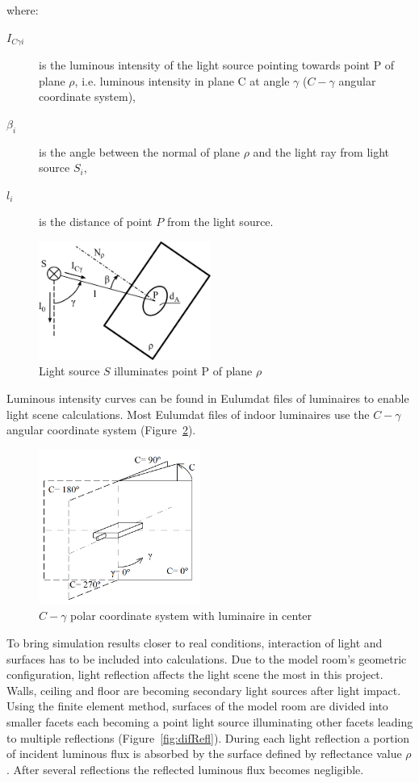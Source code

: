 \noindent where:
\begin{description}
	\item[$I_{C \gamma i}$] is the luminous intensity of the light source pointing towards point P of plane $\rho$, i.e. luminous intensity in plane C at angle $\gamma$ ($C-\gamma$ angular coordinate system),
	\item[$\beta_{i}$] is the angle between the normal of plane $\rho$ and the light ray from light source $S_{i}$,
	\item[$l_{i}$] is the distance of point $P$ from the light source.
\end{description}

\begin{figure}[htb]
  \centering
  \includegraphics[width=160pt]{315_osvetlenost_bodovym_zdrojem_2}
  \caption{Light source $S$ illuminates point P of plane $\rho$}
  \label{fig:osv}
\end{figure}

Luminous intensity curves can be found in Eulumdat files of luminaires to enable light scene calculations. Most Eulumdat files of indoor luminaires use the $C-\gamma$ angular coordinate system (Figure~\ref{fig:cgamma}).

\begin{figure}[htb]
  \centering
  \includegraphics[width=150pt]{Cgama}
  \caption{$C-\gamma$ polar coordinate system with luminaire in center}
  \label{fig:cgamma}
\end{figure}

To bring simulation results closer to real conditions, interaction of light and surfaces has to be included into calculations. Due to the model room's geometric configuration, light reflection affects the light scene the most in this project. Walls, ceiling and floor are becoming secondary light sources after light impact. Using the finite element method, surfaces of the model room are divided into smaller facets each becoming a point light source illuminating other facets leading to multiple reflections (Figure~\ref{fig:difRefl}). During each light reflection a portion of incident luminous flux is absorbed by the surface defined by reflectance value $\rho$. After several reflections the reflected luminous flux becomes negligible.

